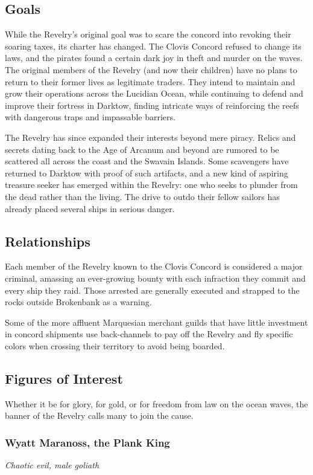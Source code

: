 \documentclass[10pt,a4paper,twoside,bg=print,twocolumn,openany,nodeprecatedcode]{dndbook}
\begin{document}
\subsection{Goals}
While the Revelry's original goal was to scare the concord into revoking their soaring taxes, its charter has changed. The Clovis Concord refused to change its laws, and the pirates found a certain dark joy in theft and murder on the waves. The original members of the Revelry (and now their children) have no plans to return to their former lives as legitimate traders. They intend to maintain and grow their operations across the Lucidian Ocean, while continuing to defend and improve their fortress in Darktow, finding intricate ways of reinforcing the reefs with dangerous traps and impassable barriers.

The Revelry has since expanded their interests beyond mere piracy. Relics and secrets dating back to the Age of Arcanum and beyond are rumored to be scattered all across the coast and the Swavain Islands. Some scavengers have returned to Darktow with proof of such artifacts, and a new kind of aspiring treasure seeker has emerged within the Revelry: one who seeks to plunder from the dead rather than the living. The drive to outdo their fellow sailors has already placed several ships in serious danger.

\subsection{Relationships}
Each member of the Revelry known to the Clovis Concord is considered a major criminal, amassing an ever-growing bounty with each infraction they commit and every ship they raid. Those arrested are generally executed and strapped to the rocks outside Brokenbank as a warning.

Some of the more affluent Marquesian merchant guilds that have little investment in concord shipments use back-channels to pay off the Revelry and fly specific colors when crossing their territory to avoid being boarded.

\subsection{Figures of Interest}
Whether it be for glory, for gold, or for freedom from law on the ocean waves, the banner of the Revelry calls many to join the cause.

\subsubsection{Wyatt Maranoss, the Plank King}
\textit{Chaotic evil, male goliath}
\end{document}
